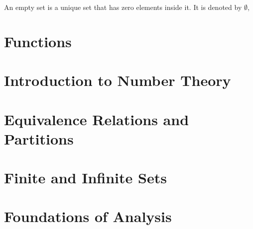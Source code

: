 \documentclass[a4paper]{article}
\begin{document}
An empty set is a unique set that has zero elements inside it. It is denoted by $\emptyset $,
\section{Functions}
\section{Introduction to Number Theory}
\section{Equivalence Relations and Partitions}
\section{Finite and Infinite Sets}
\section{Foundations of Analysis}
\end{document}

